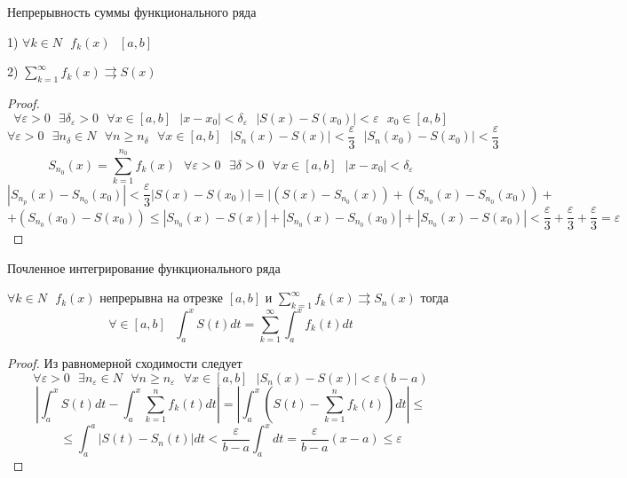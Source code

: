 \begin{title}
  Непрерывность суммы функционального ряда
\end{title}

\begin{theorem}
  1) $\forall k \in N ~~~ f_k(x) ~~~ [a,b]$

  2) $\sum_{k=1}^{\infty} f_k (x) \rightrightarrows S(x)$
\end{theorem}

\begin{proof}
  $$
  \forall \varepsilon > 0 ~~~ \exists \delta_{\varepsilon} > 0 ~~~
  \forall x \in [a,b] ~~~ |x - x_0| < \delta_{\varepsilon} ~~~
  |S(x) - S(x_0)| < \varepsilon ~~~ x_0 \in [a,b]
  $$
  $$
  \forall \varepsilon > 0 ~~~ \exists n_{\delta} \in N ~~~ \forall n \ge
  n_{\delta} ~~~ \forall x \in [a,b] ~~~ |S_n(x) - S(x)| <
  \frac{\varepsilon}{3} ~~~ |S_n(x_0) - S(x_0)| < \frac{\varepsilon}{3}
  $$
  $$
  S_{n_0}(x) = \sum_{k=1}^{n_0} f_k(x) ~~~ \forall \varepsilon > 0 ~~~
  \exists \delta > 0 ~~~ \forall x \in [a,b] ~~~ |x - x_0| <
  \delta_{\varepsilon}
  $$
  $$
  |S_{n_p}(x) - S_{n_0}(x_0)| < \frac{\varepsilon}{3}
  |S(x) - S(x_0)| =  |(S(x) - S_{n_0}(x)) + (S_{n_0}(x) - S_{n_0}(x_0)) +
  $$
  $$
  + (S_{n_0}(x_0) - S(x_0)) \le |S_{n_0}(x) - S(x)| +
  |S_{n_0}(x) - S_{n_0}(x_0)| + |S_{n_0}(x) - S(x_0)| < \frac{\varepsilon}{3} +
  \frac{\varepsilon}{3} + \frac{\varepsilon}{3} = \varepsilon
  $$
\end{proof}

\begin{title}
  Почленное интегрирование функционального ряда
\end{title}

\begin{theorem}
  $\forall k \in N ~~~ f_k(x)$ непрерывна на отрезке $[a,b]$ и
  $\sum_{k=1}^{\infty} f_k(x) \rightrightarrows S_n(x)$ тогда
  $$
  \forall \in [a,b] ~~~ \int_a^x S(t)dt =
  \sum_{k=1}^{\infty} \int_a^x f_k(t)dt
  $$
\end{theorem}

\begin{proof}
  Из равномерной сходимости следует
  $$
  \forall \varepsilon  > 0 ~~~ \exists n_{\varepsilon} \in N ~~~
  \forall n \ge n_{\varepsilon} ~~~ \forall x \in[a,b] ~~~
  |S_n(x) - S(x)| < \varepsilon (b-a)
  $$
  $$
  \left| \int_a^x S(t)dt - \int_a^x \sum_{k=1}^n f_k(t)dt \right| =
  \left| \int_a^x (S(t) - \sum_{k=1}^n f_k(t))dt \right| \le
  $$
  $$
  \le \int_a^a |S(t) - S_n(t)|dt < \frac{\varepsilon}{b-a} \int_a^x dt =
  \frac{\varepsilon}{b-a}(x-a) \le \varepsilon
  $$
\end{proof}

